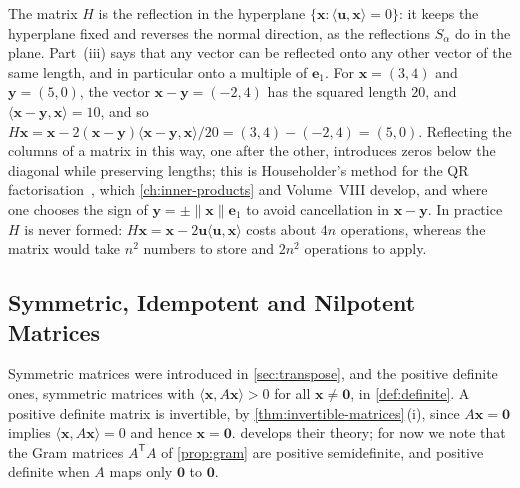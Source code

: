 The matrix $H$ is the reflection in the hyperplane $\{\mathbf x: \langle\mathbf u,\mathbf x\rangle=0\}$: it keeps the hyperplane fixed and reverses the normal direction, as the reflections $S_\alpha$ do in the plane. Part~(iii) says that any vector can be reflected onto any other vector of the same length, and in particular onto a multiple of $\mathbf e_1$. For $\mathbf x=(3,4)$ and $\mathbf y=(5,0)$, the vector $\mathbf x-\mathbf y=(-2,4)$ has the squared length $20$, and $\langle\mathbf x-\mathbf y,\mathbf x\rangle=10$, and so $H\mathbf x=\mathbf x-2(\mathbf x-\mathbf y)\langle\mathbf x-\mathbf y,\mathbf x\rangle/20=(3,4)-(-2,4)=(5,0)$. Reflecting the columns of a matrix in this way, one after the other, introduces zeros below the diagonal while preserving lengths; this is Householder's method for the QR factorisation~\cite{householder1958}, which \cref{ch:inner-products} and Volume~VIII develop, and where one chooses the sign of $\mathbf y=\pm\|\mathbf x\|\mathbf e_1$ to avoid cancellation in $\mathbf x-\mathbf y$. In practice $H$ is never formed: $H\mathbf x=\mathbf x-2\mathbf u\langle\mathbf u,\mathbf x\rangle$ costs about $4n$ operations, whereas the matrix would take $n^2$ numbers to store and $2n^2$ operations to apply.

\subsection{Symmetric, Idempotent and Nilpotent Matrices}

Symmetric matrices were introduced in \cref{sec:transpose}, and the positive definite ones, symmetric matrices with $\langle\mathbf x,A\mathbf x\rangle>0$ for all $\mathbf x\ne\mathbf 0$, in \cref{def:definite}. A positive definite matrix is invertible, by \cref{thm:invertible-matrices}\,(i), since $A\mathbf x=\mathbf 0$ implies $\langle\mathbf x,A\mathbf x\rangle=0$ and hence $\mathbf x=\mathbf 0$.  develops their theory; for now we note that the Gram matrices $A^{\mathsf T}A$ of \cref{prop:gram} are positive semidefinite, and positive definite when $A$ maps only $\mathbf 0$ to $\mathbf 0$.

